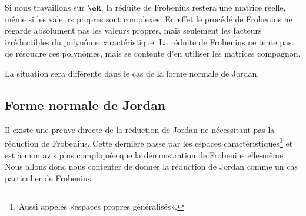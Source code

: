 \begin{remark}
    Si nous travaillons sur \( \eR\), la réduite de Frobenius restera une matrice réelle, même si les valeurs propres sont complexes. En effet le procédé de Frobenius ne regarde absolument pas les valeurs propres, mais seulement les facteurs irréductibles du polynôme caractéristique. La réduite de Frobenius ne tente pas de résoudre ces polynômes, mais se contente d'en utiliser les matrices compagnon.

    La situation sera différente dans le cas de la forme normale de Jordan.
\end{remark}

\subsection{Forme normale de Jordan}

Il existe une preuve directe de la réduction de Jordan ne nécessitant pas la réduction de Frobenius\cite{LecLinAlgAllen}. Cette dernière passe par les espaces caractéristiques\footnote{Aussi appelés «espaces propres généralisés».} et est à mon avis plus compliquée que la démonstration de Frobenius elle-même. Nous allons donc nous contenter de donner la réduction de Jordan comme un cas particulier de Frobenius.

